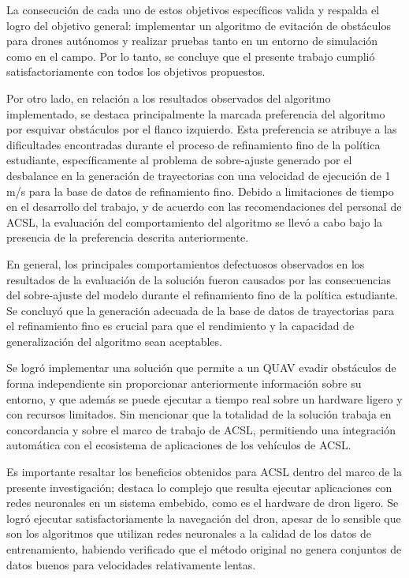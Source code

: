 La consecución de cada uno de estos objetivos específicos valida y respalda el logro del objetivo general: implementar un algoritmo de evitación de obstáculos para drones autónomos y realizar pruebas tanto en un entorno de simulación como en el campo. Por lo tanto, se concluye que el presente trabajo cumplió satisfactoriamente con todos los objetivos propuestos.


Por otro lado, en relación a los resultados observados del algoritmo implementado, se destaca principalmente la marcada preferencia del algoritmo por esquivar obstáculos por el flanco izquierdo. Esta preferencia se atribuye a las dificultades encontradas durante el proceso de refinamiento fino de la política estudiante, específicamente al problema de sobre-ajuste generado por el desbalance en la generación de trayectorias con una velocidad de ejecución de 1 m/s para la base de datos de refinamiento fino. Debido a limitaciones de tiempo en el desarrollo del trabajo, y de acuerdo con las recomendaciones del personal de ACSL, la evaluación del comportamiento del algoritmo se llevó a cabo bajo la presencia de la preferencia descrita anteriormente.

En general, los principales comportamientos defectuosos observados en los resultados de la evaluación de la solución fueron causados por las consecuencias del sobre-ajuste del modelo durante el refinamiento fino de la política estudiante. Se concluyó que la generación adecuada de la base de datos de trayectorias para el refinamiento fino es crucial para que el rendimiento y la capacidad de generalización del algoritmo sean aceptables. 

Se logró implementar una solución que permite a un QUAV evadir obstáculos de forma independiente sin proporcionar anteriormente información sobre su entorno, y que además se puede ejecutar a tiempo real sobre un hardware ligero y con recursos limitados. Sin mencionar que la totalidad de la solución trabaja en concordancia y sobre el marco de trabajo de ACSL, permitiendo una integración automática con el ecosistema de aplicaciones de los vehículos de ACSL.

Es importante resaltar los beneficios obtenidos para ACSL dentro del marco de la presente investigación; destaca lo complejo que resulta ejecutar aplicaciones con redes neuronales en un sistema embebido, como es el hardware de dron ligero. Se logró ejecutar satisfactoriamente la navegación del dron, apesar de lo sensible que son los algoritmos que utilizan redes neuronales a la calidad de los datos de entrenamiento, habiendo verificado que el método original no genera conjuntos de datos buenos para velocidades relativamente lentas. 

